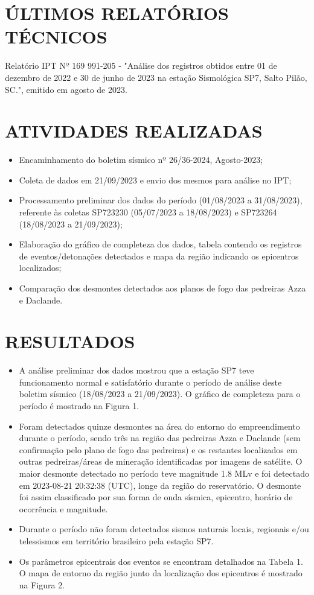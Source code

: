 \section{ÚLTIMOS RELATÓRIOS TÉCNICOS}
\label{sec:ultimos_relatorios}
\begin{itemize}
    Relatório IPT Nº 169 991-205 - "Análise dos registros obtidos entre 01 de dezembro de 2022 e 30 de junho de 2023 na estação Sismológica SP7, Salto Pilão, SC.", emitido em agosto de 2023. 
\end{itemize}

\section{ATIVIDADES REALIZADAS}
\label{sec:atividade}
\begin{itemize}
    \item Encaminhamento do boletim sísmico nº 26/36-2024, Agosto-2023;
    \item Coleta de dados em 21/09/2023 e envio dos mesmos para análise no IPT;
    \item Processamento preliminar dos dados do período (01/08/2023 a 31/08/2023), referente às coletas SP723230 (05/07/2023 a 18/08/2023) e SP723264 (18/08/2023 a 21/09/2023); 
    \item Elaboração do gráfico de completeza dos dados, tabela contendo os registros de eventos/detonações detectados e mapa da região indicando os epicentros localizados;
	\item  Comparação dos desmontes detectados aos planos de fogo das pedreiras Azza e Daclande.
\end{itemize}

\section{RESULTADOS}
\label{sec:resultados}
\begin{itemize}
	\item A análise preliminar dos dados mostrou que a estação SP7 teve funcionamento normal e satisfatório durante o período de análise deste boletim sísmico (18/08/2023 a 21/09/2023). O gráfico de completeza para o período é mostrado na Figura 1. 
    \item Foram detectados quinze desmontes na área do entorno do empreendimento durante o período, sendo três na região das pedreiras Azza e Daclande (sem confirmação pelo plano de fogo das pedreiras) e os restantes localizados em outras pedreiras/áreas de mineração identificadas por imagens de satélite. O maior desmonte detectado no período teve magnitude 1.8 MLv e foi detectado em 2023-08-21 20:32:38 (UTC), longe da região do reservatório. O desmonte foi assim classificado por sua forma de onda sísmica, epicentro, horário de ocorrência e magnitude. 
    \item Durante o período não foram detectados sismos naturais locais, regionais e/ou telessismos em território brasileiro pela estação SP7. 
    \item Os parâmetros epicentrais dos eventos se encontram detalhados na Tabela 1. O mapa de entorno da região junto da localização dos epicentros é mostrado na Figura 2. 
\end{itemize}
    

